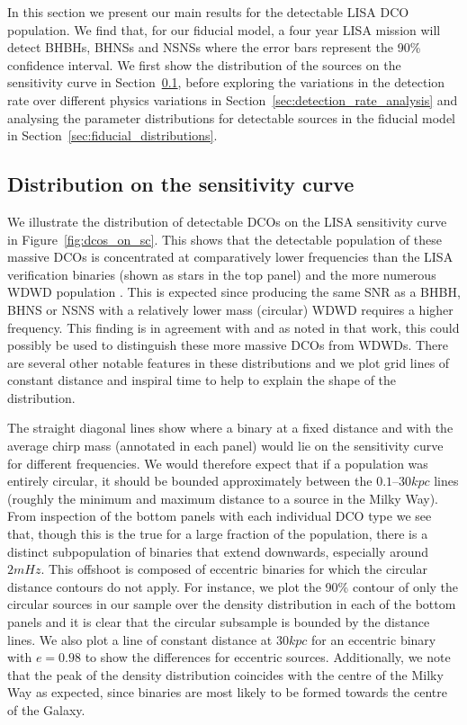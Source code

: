 In this section we present our main results for the detectable LISA DCO population. We find that, for our fiducial model, a four year LISA mission will detect  BHBHs,  BHNSs and  NSNSs where the error bars represent the 90\% confidence interval. We first show the distribution of the sources on the sensitivity curve in Section~\ref{sec:dcos_on_sc}, before exploring the variations in the detection rate over different physics variations in Section~\ref{sec:detection_rate_analysis} and analysing the parameter distributions for detectable sources in the fiducial model in Section~\ref{sec:fiducial_distributions}.

\subsection{Distribution on the sensitivity curve}\label{sec:dcos_on_sc}

We illustrate the distribution of detectable DCOs on the LISA sensitivity curve in Figure~\ref{fig:dcos_on_sc}. This shows that the detectable population of these massive DCOs is concentrated at comparatively lower frequencies than the LISA verification binaries (shown as stars in the top panel) and the more numerous WDWD population \citep[e.g.][]{Korol+2017}. This is expected since producing the same SNR as a BHBH, BHNS or NSNS with a relatively lower mass (circular) WDWD requires a higher frequency. This finding is in agreement with \citet{Sesana+2020} and as noted in that work, this could possibly be used to distinguish these more massive DCOs from WDWDs. There are several other notable features in these distributions and we plot grid lines of constant distance and inspiral time to help to explain the shape of the distribution.

The straight diagonal lines show where a binary at a fixed distance and with the average chirp mass (annotated in each panel) would lie on the sensitivity curve for different frequencies. We would therefore expect that if a population was entirely circular, it should be bounded approximately between the $0.1$--$30 \unit{kpc}$ lines (roughly the minimum and maximum distance to a source in the Milky Way). From inspection of the bottom panels with each individual DCO type we see that, though this is the true for a large fraction of the population, there is a distinct subpopulation of binaries that extend downwards, especially around $2 \unit{mHz}$. This offshoot is composed of eccentric binaries for which the circular distance contours do not apply. For instance, we plot the 90\% contour of only the circular sources in our sample over the density distribution in each of the bottom panels and it is clear that the circular subsample is bounded by the distance lines. We also plot a line of constant distance at $30 \unit{kpc}$ for an eccentric binary with $e = 0.98$ to show the differences for eccentric sources. Additionally, we note that the peak of the density distribution coincides with the centre of the Milky Way as expected, since binaries are most likely to be formed towards the centre of the Galaxy.


